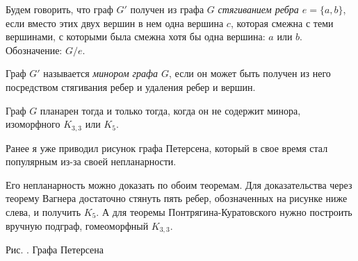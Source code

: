\begin{definition}
	Будем говорить, что граф $G'$ получен из графа $G$ \emph{стягиванием ребра $e = \lbrace a, b\rbrace$}, 
	если вместо этих двух вершин в нем одна вершина $c$, которая смежна с теми вершинами, с которыми была 
	смежна хотя бы одна вершина: $a$ или $b$. Обозначение: $G/e$.
\end{definition}

\begin{definition}
	Граф $G'$ называется \emph{минором графа $G$}, если он может быть получен из него посредством стягивания ребер и удаления ребер и вершин.
\end{definition}

\begin{theorem}[Вагнера]
	Граф $G$ планарен тогда и только тогда, когда он не содержит минора, изоморфного $K_{3, 3}$ или $K_5$.
\end{theorem}

\begin{paracol}{2}
	
\begin{example}
	Ранее я уже приводил рисунок графа Петерсена, который в свое время стал популярным из-за своей непланарности.
	
	Его непланарность можно доказать по обоим теоремам. Для доказательства через теорему
	Вагнера достаточно стянуть пять ребер, обозначенных на рисунке ниже слева, и получить $K_5$. 
	А для теоремы Понтрягина-Куратовского нужно построить вручную подграф, гомеоморфный $K_{3, 3}$.
\end{example}

\switchcolumn

\begin{center}\end{center}
\begin{center}
	\small Рис. \images. Графа Петерсена
\end{center}
\end{paracol}

